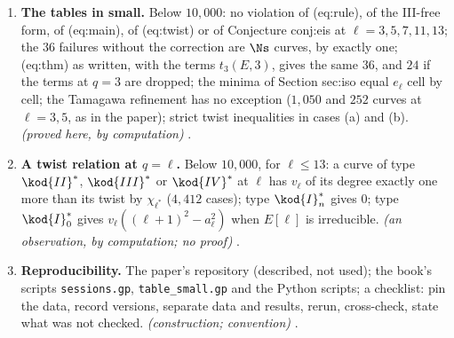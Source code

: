 \begin{enumerate}[label=\textbf{\thechapter.\arabic*}]
\item \textbf{The tables in small.} Below $10{,}000$: no violation of (eq:rule), of the III-free form, of (eq:main), of (eq:twist) or of Conjecture conj:eis at
$\ell=3,5,7,11,13$; the $36$ failures without the correction are $\Ns$ curves, by exactly one; (eq:thm) as written, with the terms $t_3(E,3)$, gives the same $36$, and $24$ if
the terms at $q=3$ are dropped; the minima of Section sec:iso
equal $e_\ell$ cell by cell; the Tamagawa refinement has no exception ($1{,}050$ and $252$ curves at $\ell=3,5$, as in the paper); strict twist inequalities in
cases (a) and (b). \emph{(proved here, by computation)}
.
\item \textbf{A twist relation at $q=\ell$.} Below $10{,}000$, for $\ell\le13$: a curve of type $\kod{II}^*$, $\kod{III}^*$ or $\kod{IV}^*$ at $\ell$ has $v_\ell$ of its degree exactly one more than its
twist by $\chi_{\ell^*}$ ($4{,}412$ cases); type $\kod{I}_n^*$ gives $0$; type $\kod{I}_0^*$ gives $v_\ell((\ell+1)^2-a_\ell^2)$ when $E[\ell]$ is irreducible. \emph{(an observation, by
computation; no proof)} .
\item \textbf{Reproducibility.} The paper's repository (described, not used); the book's scripts \texttt{sessions.gp}, \texttt{table\_small.gp} and the Python
scripts; a checklist: pin the data, record versions, separate data and results, rerun, cross-check, state what was not checked. \emph{(construction;
convention)} .
\end{enumerate}


